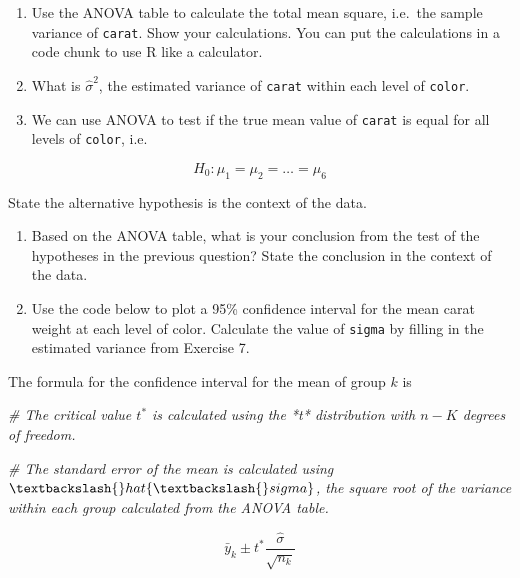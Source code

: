 \documentclass[]{book}
\newenvironment{Shaded}{\begin{snugshade}}{\end{snugshade}}
\newcommand{\CommentTok}[1]{\textcolor[rgb]{0.56,0.35,0.01}{\textit{#1}}}
\begin{document}
\begin{enumerate}
\def\labelenumi{\arabic{enumi}.}
\setcounter{enumi}{5}
\item
  Use the ANOVA table to calculate the total mean square, i.e.~the
  sample variance of \texttt{carat}. Show your calculations. You can put
  the calculations in a code chunk to use R like a calculator.
\item
  What is \(\hat{\sigma}^2\), the estimated variance of \texttt{carat}
  within each level of \texttt{color}.
\item
  We can use ANOVA to test if the true mean value of \texttt{carat} is
  equal for all levels of \texttt{color}, i.e.
\end{enumerate}

\[ H_0: \mu_1 = \mu_2 = \dots = \mu_6\]

State the alternative hypothesis is the context of the data.

\begin{enumerate}
\def\labelenumi{\arabic{enumi}.}
\setcounter{enumi}{8}
\item
  Based on the ANOVA table, what is your conclusion from the test of the
  hypotheses in the previous question? State the conclusion in the
  context of the data.
\item
  Use the code below to plot a 95\% confidence interval for the mean
  carat weight at each level of color. Calculate the value of
  \texttt{sigma} by filling in the estimated variance from Exercise 7.
\end{enumerate}

The formula for the confidence interval for the mean of group \(k\) is

\begin{Shaded}
\begin{Highlighting}[]
\CommentTok{# The critical value $t^*$ is calculated using the *t* distribution with $n-K$ degrees of freedom. }
\end{Highlighting}
\end{Shaded}

\begin{Shaded}
\begin{Highlighting}[]
\CommentTok{# The standard error of the mean is calculated using $\textbackslash{}hat\{\textbackslash{}sigma\}$, the square root of the variance within each group calculated from the ANOVA table.}
\end{Highlighting}
\end{Shaded}

\[\bar{y}_k \pm t^* \frac{\hat{\sigma}}{\sqrt{n_k}}\]
\end{document}
